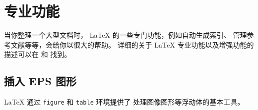 ﻿%


\chapter{专业功能}

\begin{intro}
  当你整理一个大型文档时， \LaTeX{} 的一些专门功能，例如自动生成索引、
  管理参考文献等等，会给你以很大的帮助。
  详细的关于 \LaTeX{} 专业功能以及增强功能的描述可以在
   {\normalfont\manual{}} 和 {\normalfont \companion} 找到。
\end{intro}


\section{插入 EPS 图形}\label{eps}


\LaTeX{} 通过 \texttt{figure} 和 \texttt{table} 环境提供了
处理图像图形等浮动体的基本工具。


